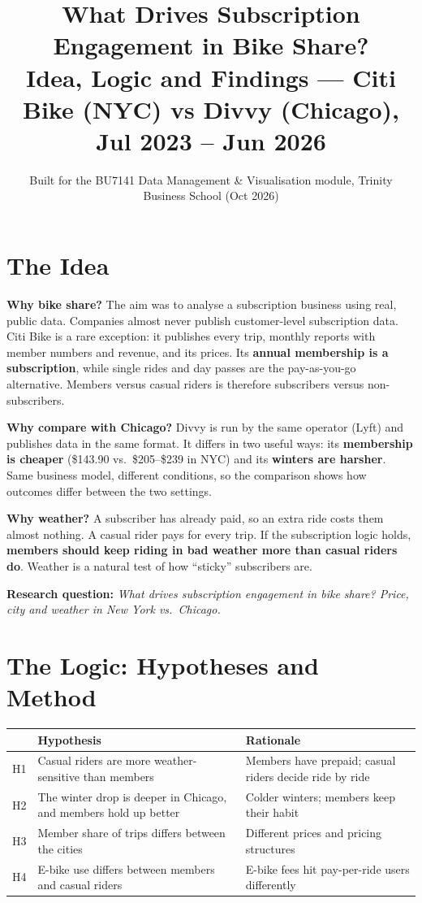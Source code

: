 \documentclass[11pt,a4paper]{article}
\title{\color{accent}\textbf{What Drives Subscription Engagement in Bike Share?}\\[4pt]
\large Idea, Logic and Findings --- Citi Bike (NYC) vs Divvy (Chicago), Jul 2023 -- Jun 2026}
\date{Built for the BU7141 Data Management \& Visualisation module, Trinity Business School (Oct 2026)}
\begin{document}
\maketitle

\section{The Idea}
\textbf{Why bike share?} The aim was to analyse a subscription business using real, public data. Companies almost never publish customer-level subscription data. Citi Bike is a rare exception: it publishes every trip, monthly reports with member numbers and revenue, and its prices. Its \textbf{annual membership is a subscription}, while single rides and day passes are the pay-as-you-go alternative. Members versus casual riders is therefore subscribers versus non-subscribers.

\textbf{Why compare with Chicago?} Divvy is run by the same operator (Lyft) and publishes data in the same format. It differs in two useful ways: its \textbf{membership is cheaper} (\$143.90 vs.\ \$205--\$239 in NYC) and its \textbf{winters are harsher}. Same business model, different conditions, so the comparison shows how outcomes differ between the two settings.

\textbf{Why weather?} A subscriber has already paid, so an extra ride costs them almost nothing. A casual rider pays for every trip. If the subscription logic holds, \textbf{members should keep riding in bad weather more than casual riders do}. Weather is a natural test of how ``sticky'' subscribers are.

\textbf{Research question:} \emph{What drives subscription engagement in bike share? Price, city and weather in New York vs.\ Chicago.}

\section{The Logic: Hypotheses and Method}

\begin{tabularx}{\linewidth}{@{}lLL@{}}
\toprule
& Hypothesis & Rationale \\
\midrule
H1 & Casual riders are more weather-sensitive than members & Members have prepaid; casual riders decide ride by ride \\
H2 & The winter drop is deeper in Chicago, and members hold up better & Colder winters; members keep their habit \\
H3 & Member share of trips differs between the cities & Different prices and pricing structures \\
H4 & E-bike use differs between members and casual riders & E-bike fees hit pay-per-ride users differently \\
\bottomrule
\end{tabularx}
\end{document}
